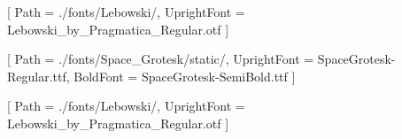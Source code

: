 

\usepackage[no-math]{fontspec}


\setmonofont{Lebowski}[
	Path        = ./fonts/Lebowski/,
	UprightFont = Lebowski_by_Pragmatica_Regular.otf
]

\setmainfont{SpaceGrotesk}[
	Path        = ./fonts/Space_Grotesk/static/,
	UprightFont = SpaceGrotesk-Regular.ttf,
	BoldFont    = SpaceGrotesk-SemiBold.ttf
]

[
	Path        = ./fonts/Lebowski/,
	UprightFont = Lebowski_by_Pragmatica_Regular.otf
]

\let\cyrillicfontsf=\cyrillicfont


\usepackage[babelshorthands]{polyglossia}
\setdefaultlanguage{russian}





\usepackage[%
	protrusion=true,
	babel=true,
	factor=1000
]{microtype}

